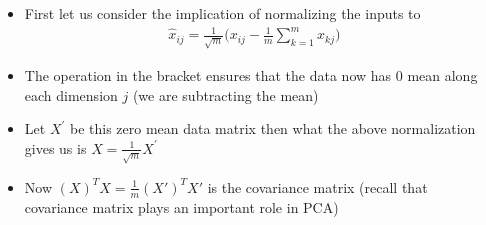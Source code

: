 \begin{frame}
    \begin{columns}
        \begin{overlayarea}{\textwidth}{\textheight}
            
        \end{overlayarea}

        \begin{overlayarea}{\textwidth}{\textheight}
            \begin{itemize}\justifying
                \item<1-> First let us consider the implication of normalizing the inputs to
                \begin{align*}
                    \hat{x}_{ij} = \frac{1}{\sqrt{m}}\Bigg(x_{ij}-\frac{1}{m}\sum\limits_{k=1}^mx_{kj}\Bigg) 
                \end{align*}
                \vspace{-0.2in}
                
                \item<2-> The operation in the bracket ensures that the data now has 0 mean along each dimension $j$ (we are subtracting the mean)
                \item<3-> Let $X^{'}$ be this zero mean data matrix then what the above normalization gives us is $X= \frac{1}{\sqrt{m}}X^{'}$
                \item<4-> Now $(X)^TX =\frac{1}{m}(X')^TX'$ is the covariance matrix (recall that covariance matrix plays an important role in PCA)
            \end{itemize}
        \end{overlayarea}
    \end{columns}
\end{frame}


